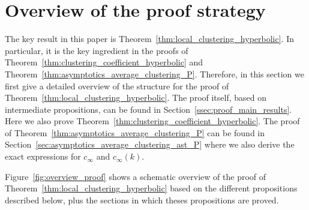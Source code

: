 \section{Overview of the proof strategy}\label{sec:proof_outline}

The key result in this paper is Theorem~\ref{thm:local_clustering_hyperbolic}. In particular, it is the key ingredient in the proofs of Theorem~\ref{thm:clustering_coefficient_hyperbolic} and Theorem~\ref{thm:asymptotics_average_clustering_P}. Therefore, in this section we first give a detailed overview of the structure for the proof of Theorem~\ref{thm:local_clustering_hyperbolic}. The proof itself, based on intermediate propositions, can be found in Section~\ref{ssec:proof_main_results}. Here we also prove Theorem~\ref{thm:clustering_coefficient_hyperbolic}. The proof of Theorem~\ref{thm:asymptotics_average_clustering_P} can be found in Section~\ref{sec:asymptotics_average_clustering_ast_P} where we also derive the exact expressions for $c_\infty$ and $c_\infty(k)$.

Figure~\ref{fig:overview_proof} shows a schematic overview of the proof of Theorem~\ref{thm:local_clustering_hyperbolic} based on the different propositions described below, plus the sections in which theses propositions are proved.

